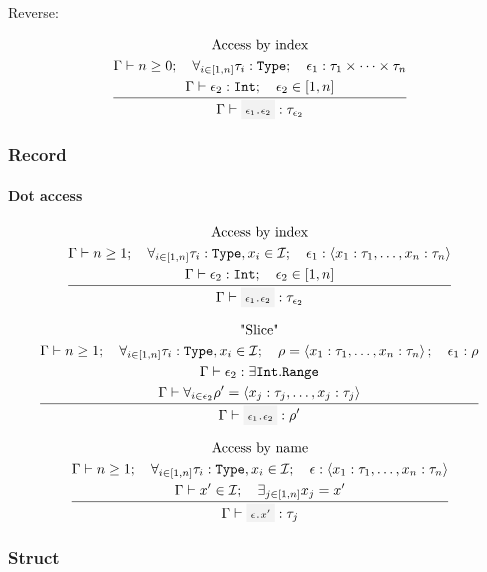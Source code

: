 Reverse: 

\[
	\infrule{
		\text{Access by index}\\*
		\EnvSym\then n \geq 0 \semiq \forall_{i\in[1,n]}{\tau_i:\Type} \semiq \expr_1:\tau_1 \times \dotsb \times \tau_n \\*
		\EnvSym\then \expr_2:\Int \semiq \expr_2 \in [1,n]
	}{
		\EnvSym\then \code{$\expr_1$.$\expr_2$}: \tau_{\expr_2}
	}
\]

\subsubsection{Record}

\paragraph{Dot access}

\[
	\infrule{
		\text{Access by index} \\*
		\EnvSym\then n \geq 1 \semiq \forall_{i\in[1,n]}{\tau_i:\Type, x_i\in\Id} \semiq \expr_1:\tuple{x_1:\tau_1,\dotsc,x_n:\tau_n}\\*
		\EnvSym\then \expr_2:\Int \semiq \expr_2 \in [1,n]
	}{
		\EnvSym\then \code{$\expr_1$.$\expr_2$}: \tau_{\expr_2}
	}
\]


\[
	\infrule{
		\text{"Slice"}\\*
		\EnvSym\then n \geq 1 \semiq \forall_{i\in[1,n]}{\tau_i:\Type, x_i\in\Id} \semiq \rho=\tuple{x_1:\tau_1,\dotsc,x_n:\tau_n} \semiq \expr_1:\rho\\*
		\EnvSym\then \expr_2:\exists\Int.\Range \\*
		\EnvSym\then \forall_{i\in\expr_2}{\rho'=\tuple{x_j:\tau_j, \dotsc, x_j:\tau_j}}
	}{
		\EnvSym\then \code{$\expr_1$.$\expr_2$}: \rho'
	}
\]

\[
	\infrule{
		\text{Access by name}\\*
		\EnvSym\then n \geq 1 \semiq \forall_{i\in[1,n]}{\tau_i:\Type, x_i \in \Id} \semiq \expr:\tuple{x_1:\tau_1,\dotsc,x_n:\tau_n} \\*
		\EnvSym\then x' \in \Id \semiq \exists_{j\in[1,n]} x_j = x'
	}{
		\EnvSym\then \code{$\expr$.$x'$}: \tau_j
	}
\]

\subsubsection{Struct}


